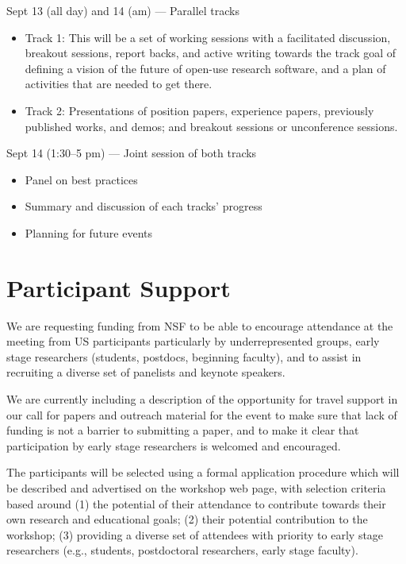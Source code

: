 \documentclass[11pt]{article}
\newenvironment{shortlist}{
        \vspace*{-0.8em}
  \begin{itemize}
  \setlength{\itemsep}{-0.3em}
}{
  \end{itemize}
        \vspace*{-0.6em}
}
\begin{document}
Sept 13 (all day) and 14 (am) --- Parallel tracks

\begin{shortlist}
\item Track 1: This will be a set of working sessions with a facilitated discussion, breakout sessions, report backs, and active writing towards the track goal of defining a vision of the future of open-use research software, and a plan of activities that are needed to get there.
\item Track 2: Presentations of position papers, experience papers, previously published works, and demos; and breakout sessions or unconference sessions.
\end{shortlist}

Sept 14 (1:30--5 pm) --- Joint session of both tracks

\begin{shortlist}
\item Panel on best practices
\item Summary and discussion of each tracks' progress
\item Planning for future events
\end{shortlist}


\section{Participant Support}

We are requesting funding from NSF to be able to encourage attendance at the meeting from US participants particularly by underrepresented groups, early stage researchers (students, postdocs, beginning faculty), and to assist in recruiting a diverse set of panelists and keynote speakers. 

We are currently including a description of the opportunity for travel support in our call for papers and outreach material for the event to make sure that lack of funding is not a barrier to submitting a paper, and to make it clear that participation by early stage researchers is welcomed and encouraged. 

The participants will be selected using a formal application procedure which will be described and advertised on the workshop web page, with selection criteria based around (1) the potential of their attendance to contribute towards their own research and educational goals; (2) their potential contribution to the workshop; (3) providing a diverse set of attendees with priority to early stage researchers (e.g., students, postdoctoral researchers, early stage faculty).
\end{document}
